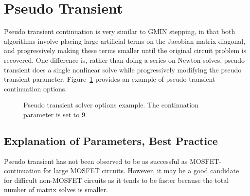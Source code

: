 \newpage 
\section{Pseudo Transient}
\label{continuation_pseudotran}

Pseudo transient continuation is very similar to GMIN stepping, in
that both algorithms involve placing large artificial terms on the
Jacobian matrix diagonal, and progressively making these terms smaller
until the original circuit problem is recovered.  One difference is,
rather than doing a series on Newton solves, pseudo transient does a
single nonlinear solve while progressively modifying the pseudo
transient parameter. Figure~\ref{pseudo_netlist_frag} provides an
example of pseudo transient continuation options.

\begin{figure}[htbp]
\begin{centering}
\caption [Pseudo transient solver options example.]{Pseudo transient solver options example. The continuation parameter is set to 9. \label{pseudo_netlist_frag}} 
\end{centering}
\end{figure}

\subsection{Explanation of Parameters, Best Practice}

Pseudo transient has not been observed to be as successful as
MOSFET-continuation for large MOSFET circuits. However, it may be a good
candidate for difficult non-MOSFET circuits as it tends to be faster
because the total number of matrix solves is smaller.


